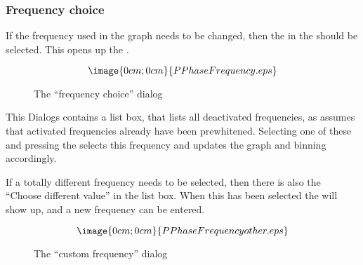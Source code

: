 \subsubsection{Frequency choice}%
\label{period.phase.frequency}
If the frequency used in the graph needs to be changed, then the 
 in the  should be selected.
This opens up the 
.
\begin{figure}[h]
$$\image{0cm;0cm}{PPhaseFrequency.eps}$$%
\caption{The ``frequency choice'' dialog}%
\label{period.phase.frequency.dialog}
\end{figure}

This Dialogs contains a list box, that
lists all deactivated frequencies, as \period assumes
that activated frequencies already have been prewhitened.
Selecting one of these and pressing the  selects
this frequency and updates the graph and binning accordingly.

If a totally different frequency needs to be selected, then there is also
the ``Choose different value'' in the list box.
When this has been selected the 
will show up, and a new frequency can be entered.
\begin{figure}[h]
$$\image{0cm;0cm}{PPhaseFrequencyother.eps}$$%
\caption{The ``custom frequency'' dialog}%
\label{period.phase.frequency.other.dialog}
\end{figure}

